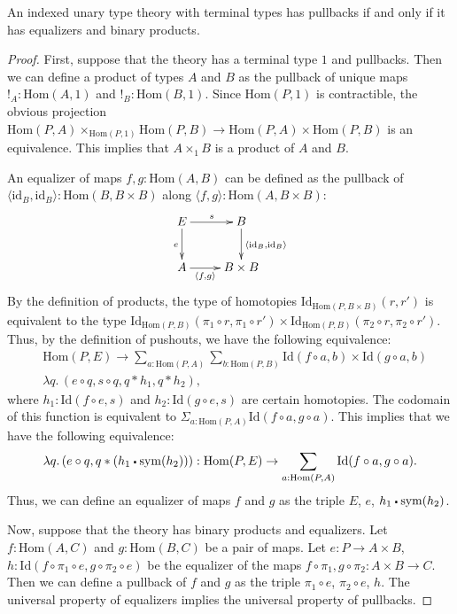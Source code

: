 \documentclass[reqno]{amsart}
\theoremstyle{definition}
\theoremstyle{remark}
\newcommand{\fs}[1]{\mathrm{#1}}
\newcommand{\Hom}{\fs{Hom}}
\newcommand{\Id}{\fs{Id}}
\newcommand{\sym}{\fs{sym}}
\newcommand{\id}{\fs{id}}
\numberwithin{figure}{section}
\newcommand{\ct}{%
  \mathchoice{\mathbin{\raisebox{0.25ex}{$\displaystyle\centerdot$}}}%
             {\mathbin{\raisebox{0.25ex}{$\centerdot$}}}%
             {\mathbin{\raisebox{0.25ex}{$\scriptstyle\,\centerdot\,$}}}%
             {\mathbin{\raisebox{0.25ex}{$\scriptscriptstyle\,\centerdot\,$}}}
}
\begin{document}
\begin{prop}
An indexed unary type theory with terminal types has pullbacks if and only if it has equalizers and binary products.
\end{prop}
\begin{proof}
First, suppose that the theory has a terminal type $1$ and pullbacks.
Then we can define a product of types $A$ and $B$ as the pullback of unique maps $!_A : \Hom(A,1)$ and $!_B : \Hom(B,1)$.
Since $\Hom(P,1)$ is contractible, the obvious projection $\Hom(P,A) \times_{\Hom(P,1)} \Hom(P,B) \to \Hom(P,A) \times \Hom(P,B)$ is an equivalence.
This implies that $A \times_1 B$ is a product of $A$ and $B$.

An equalizer of maps $f,g : \Hom(A,B)$ can be defined as the pullback of $\langle \id_B, \id_B \rangle : \Hom(B, B \times B)$ along $\langle f, g \rangle : \Hom(A, B \times B)$:
\[ \xymatrix{ E \ar[r]^s \ar[d]_e & B \ar[d]^{\langle \id_B, \id_B \rangle} \\
              A \ar[r]_-{\langle f, g \rangle} & B \times B
            } \]
By the definition of products, the type of homotopies $\Id_{\Hom(P, B \times B)}(r,r')$ is equivalent to the type $\Id_{\Hom(P,B)}(\pi_1 \circ r, \pi_1 \circ r') \times \Id_{\Hom(P,B)}(\pi_2 \circ r, \pi_2 \circ r')$.
Thus, by the definition of pushouts, we have the following equivalence:
\begin{align*}
& \Hom(P,E) \to \sum_{a : \Hom(P,A)} \sum_{b : \Hom(P,B)} \Id(f \circ a, b) \times \Id(g \circ a, b) \\
& \lambda q.\,(e \circ q, s \circ q, q * h_1, q * h_2),
\end{align*}
where $h_1 : \Id(f \circ e, s)$ and $h_2 : \Id(g \circ e, s)$ are certain homotopies.
The codomain of this function is equivalent to $\Sigma_{a : \Hom(P,A)} \Id(f \circ a, g \circ a)$.
This implies that we have the following equivalence:
\[ \lambda q.\,(e \circ q, q * (h_1 \ct \sym(h_2))) : \Hom(P,E) \to \sum_{a : \Hom(P,A)} \Id(f \circ a, g \circ a). \]
Thus, we can define an equalizer of maps $f$ and $g$ as the triple $E$, $e$, $h_1 \ct \sym(h_2)$.

Now, suppose that the theory has binary products and equalizers.
Let $f : \Hom(A,C)$ and $g : \Hom(B,C)$ be a pair of maps.
Let $e : P \to A \times B$, $h : \Id(f \circ \pi_1 \circ e, g \circ \pi_2 \circ e)$ be the equalizer of the maps $f \circ \pi_1, g \circ \pi_2 : A \times B \to C$.
Then we can define a pullback of $f$ and $g$ as the triple $\pi_1 \circ e$, $\pi_2 \circ e$, $h$.
The universal property of equalizers implies the universal property of pullbacks.
\end{proof}
\end{document}
